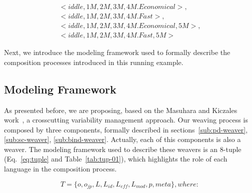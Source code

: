 \documentclass{acm_proc_article-sp}
\begin{document}
\begin{description}
\begin{enumerate}
\begin{small}
\begin{eqnarray*}
<iddle,1M,2M,3M,4M.Economical>, \\ <iddle,1M,2M,3M,4M.Fast>, \\
<iddle,1M,2M,3M,4M.Economical,5M>, \\ <iddle,1M,2M,3M,4M.Fast, 5M>
\end{eqnarray*}
\end{small}
 
\end{enumerate}

Next, we introduce the modeling framework used to formally describe the composition processes introduced in this running example. 
\end{description}

\subsection{Modeling Framework}

As presented before, we are proposing, based on the Masuhara and Kiczales work~\cite{kiczales-ecoop-2003}, a crosscutting 
variability management approach. Our weaving process is composed by three components, formally described in sections~\ref{sub:pd-weaver}, \ref{sub:sc-weaver}, \ref{sub:bind-weaver}. Actually, each of this components is also a weaver. The modeling framework used to describe these weavers is an 8-tuple (Eq.~\ref{eq:tuple} and 
Table~\ref{tab:tup-01}), which highlights the role of each language in the composition process. 

\begin{equation}
T = \{o, o_{jp}, L, L_{id}, L_{eff}, L_{mod}, p, meta\}, where:
\label{eq:tuple}
\end{equation}
\end{document}
